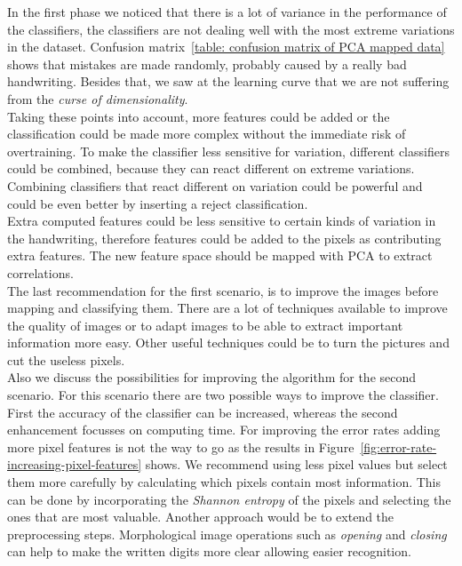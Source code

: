 \documentclass{article}
\begin{document}
In the first phase we noticed that there is a lot of variance in the performance of the classifiers, the classifiers are not dealing well with the most extreme variations in the dataset. Confusion matrix~\ref{table: confusion matrix of PCA mapped data} shows that mistakes are made randomly, probably caused by a really bad handwriting. Besides that, we saw at the learning curve that we are not suffering from the \emph{curse of dimensionality}. \\

Taking these points into account, more features could be added or the classification could be made more complex without the immediate risk of overtraining. To make the classifier less sensitive for variation, different classifiers could be combined, because they can react different on extreme variations. Combining classifiers that react different on variation could be powerful and could be even better by inserting a reject classification. \\

Extra computed features could be less sensitive to certain kinds of variation in the handwriting, therefore features could be added to the pixels as contributing extra features. The new feature space should be mapped with PCA to extract correlations.\\

The last recommendation for the first scenario, is to improve the images before mapping and classifying them. There are a lot of techniques available to improve the quality of images or to adapt images to be able to extract important information more easy. Other useful techniques could be to turn the pictures and cut the useless pixels. \\

Also we discuss the possibilities for improving the algorithm for the second scenario. For this scenario there are two possible ways to improve the classifier. First the accuracy of the classifier can be increased, whereas the second enhancement focusses on computing time. For improving the error rates adding more pixel features is not the way to go as the results in Figure~\ref{fig:error-rate-increasing-pixel-features} shows. We recommend using less pixel values but select them more carefully by calculating which pixels contain most information. This can be done by incorporating the \emph{Shannon entropy} of the pixels and selecting the ones that are most valuable. Another approach would be to extend the preprocessing steps. Morphological image operations such as \emph{opening} and \emph{closing} can help to make the written digits more clear allowing easier recognition. \\
\end{document}
